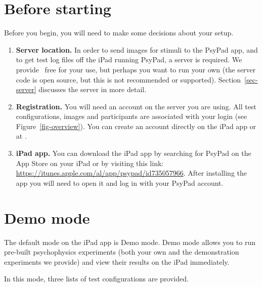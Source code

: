 \documentclass{article}
\begin{document}
\newpage
\tableofcontents

\newpage

\section{Before starting}

Before you begin, you will need to make some decisions about your setup.

\begin{enumerate}

\item {\bf Server location.} In order 
to send images for stimuli to the PsyPad app, 
and to get test log files off the 
iPad running PsyPad, a server is required.  
We provide \ 
free for your use, but perhaps you want to run your own (the server code is open source, but this is not recommended or supported). 
Section~\ref{sec-server} discusses the server in more detail.

\item {\bf Registration.}
You will need an account on the server you are using. All test configurations, images and participants are associated with your login (see Figure~\ref{fig-overview}). You can create an account directly on the iPad app or at .

\item {\bf iPad app.}
You can download the iPad app by searching for PsyPad on the App Store on your iPad or by visiting this link: \url{https://itunes.apple.com/al/app/psypad/id735057966}. After installing the app you will need to open it and log in with your PsyPad account.

\end{enumerate}


\section{Demo mode}
\label{sec-demoMode}

The default mode on the iPad app is Demo mode. Demo mode allows you to run pre-built 
psychophysics experiments (both your own and the demonstration experiments we provide) 
and view their results on the iPad immediately.

In this mode, three lists of test configurations are provided.
\end{document}
